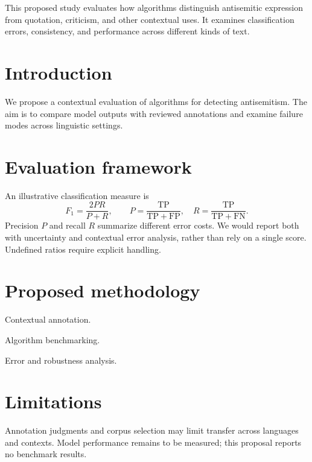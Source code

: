 

\begin{paperabstract}
This proposed study evaluates how algorithms distinguish antisemitic expression from quotation, criticism, and other contextual uses. It examines classification errors, consistency, and performance across different kinds of text.
\end{paperabstract}

\section{Introduction}
We propose a contextual evaluation of algorithms for detecting antisemitism. The aim is to compare model outputs with reviewed annotations and examine failure modes across linguistic settings.

\section{Evaluation framework}
An illustrative classification measure is
\[
  F_1=\frac{2PR}{P+R},\qquad
  P=\frac{\mathrm{TP}}{\mathrm{TP}+\mathrm{FP}},\quad
  R=\frac{\mathrm{TP}}{\mathrm{TP}+\mathrm{FN}}.
\]
Precision $P$ and recall $R$ summarize different error costs. We would report both with uncertainty and contextual error analysis, rather than rely on a single score. Undefined ratios require explicit handling.

\section{Proposed methodology}
\begin{methodlist}
  \item Contextual annotation.
  \item Algorithm benchmarking.
  \item Error and robustness analysis.
\end{methodlist}

\section{Limitations}
Annotation judgments and corpus selection may limit transfer across languages and contexts. Model performance remains to be measured; this proposal reports no benchmark results.

